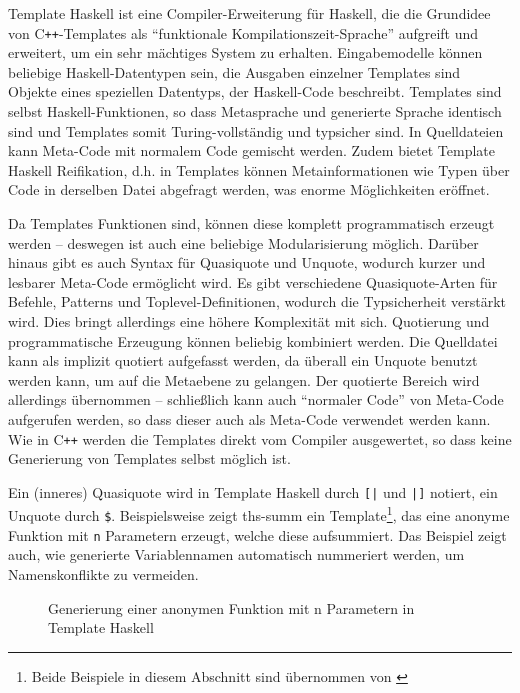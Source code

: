 \documentclass[12pt, a4paper, bibgerm]{scrbook}
\newenvironment{DIFnomarkup}{}{}
\newcommand\icode[1]{\lstinline?#1?}
\newcommand\abb{}
\newcommand{\cpp}{C\texttt{++}}
\begin{document}
Template Haskell ist eine Compiler-Erweiterung für Haskell, die die
Grundidee von \cpp{}-Templates als "`funktionale
Kompilationszeit-Sprache"' aufgreift und erweitert, um ein sehr
mächtiges System zu erhalten. Eingabemodelle können beliebige
Haskell-Datentypen sein, die Ausgaben einzelner Templates sind Objekte
eines speziellen Datentyps, der Haskell-Code beschreibt. Templates sind
selbst Haskell-Funktionen, so dass Metasprache und generierte Sprache
identisch sind und Templates somit Turing-vollständig und typsicher
sind. In Quelldateien kann Meta-Code mit normalem Code gemischt
werden. Zudem bietet Template Haskell Reifikation, d.h. in Templates
können Metainformationen wie Typen über Code in derselben Datei
abgefragt werden, was enorme Möglichkeiten eröffnet.

Da Templates Funktionen sind, können diese komplett programmatisch
erzeugt werden -- deswegen ist auch eine beliebige Modularisierung
möglich. Darüber hinaus gibt es auch Syntax für Quasiquote und Unquote,
wodurch kurzer und lesbarer Meta-Code ermöglicht wird. Es gibt
verschiedene Quasiquote-Arten für Befehle, Patterns und
Toplevel-Definitionen, wodurch die Typsicherheit verstärkt wird. Dies
bringt allerdings eine höhere Komplexität mit sich. Quotierung und
programmatische Erzeugung können beliebig kombiniert werden. Die
Quelldatei kann als implizit quotiert aufgefasst werden, da überall ein
Unquote benutzt werden kann, um auf die Metaebene zu gelangen. Der
quotierte Bereich wird allerdings übernommen -- schließlich kann auch
"`normaler Code"' von Meta-Code aufgerufen werden, so dass dieser auch
als Meta-Code verwendet werden kann. Wie in \cpp{} werden die Templates
direkt vom Compiler ausgewertet, so dass keine Generierung von Templates
selbst möglich ist.

Ein (inneres) Quasiquote wird in Template Haskell durch \icode{[|} und
  \icode{|]} notiert, ein Unquote durch \icode{$}. %
Beispielsweise zeigt \abb{ths-summ} ein Template\footnote{Beide
  Beispiele in diesem Abschnitt sind übernommen von \cite{ThsTutorial}}, das eine anonyme
Funktion mit \icode{n} Parametern erzeugt, welche diese aufsummiert. Das
Beispiel zeigt auch, wie generierte Variablennamen automatisch
nummeriert werden, um Namenskonflikte zu vermeiden.

\begin{figure}[h]
  \centering
\begin{DIFnomarkup}\end{DIFnomarkup} %
  \caption{Generierung einer anonymen Funktion mit n Parametern in Template Haskell}
  \label{magicl:fig:ths-summ}
\end{figure}
\end{document}
